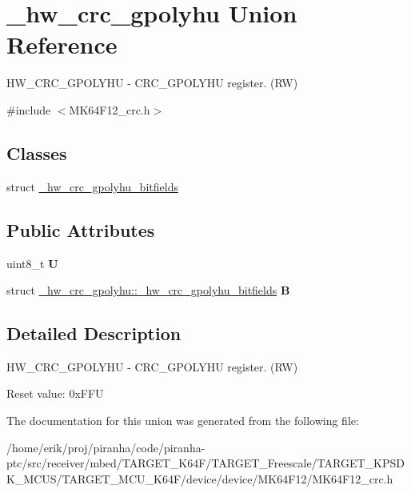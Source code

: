 \hypertarget{union__hw__crc__gpolyhu}{}\section{\+\_\+hw\+\_\+crc\+\_\+gpolyhu Union Reference}
\label{union__hw__crc__gpolyhu}


H\+W\+\_\+\+C\+R\+C\+\_\+\+G\+P\+O\+L\+Y\+HU -\/ C\+R\+C\+\_\+\+G\+P\+O\+L\+Y\+HU register. (RW)  




{\ttfamily \#include $<$M\+K64\+F12\+\_\+crc.\+h$>$}

\subsection*{Classes}
\begin{DoxyCompactItemize}
\item 
struct \hyperlink{struct__hw__crc__gpolyhu_1_1__hw__crc__gpolyhu__bitfields}{\+\_\+hw\+\_\+crc\+\_\+gpolyhu\+\_\+bitfields}
\end{DoxyCompactItemize}
\subsection*{Public Attributes}
\begin{DoxyCompactItemize}
\item 
uint8\+\_\+t {\bfseries U}\hypertarget{union__hw__crc__gpolyhu_a669b729c45e2e57ae382efd4847539c2}{}\label{union__hw__crc__gpolyhu_a669b729c45e2e57ae382efd4847539c2}

\item 
struct \hyperlink{struct__hw__crc__gpolyhu_1_1__hw__crc__gpolyhu__bitfields}{\+\_\+hw\+\_\+crc\+\_\+gpolyhu\+::\+\_\+hw\+\_\+crc\+\_\+gpolyhu\+\_\+bitfields} {\bfseries B}\hypertarget{union__hw__crc__gpolyhu_a58c9b37d0872b2d68afe75856ed99c6f}{}\label{union__hw__crc__gpolyhu_a58c9b37d0872b2d68afe75856ed99c6f}

\end{DoxyCompactItemize}


\subsection{Detailed Description}
H\+W\+\_\+\+C\+R\+C\+\_\+\+G\+P\+O\+L\+Y\+HU -\/ C\+R\+C\+\_\+\+G\+P\+O\+L\+Y\+HU register. (RW) 

Reset value\+: 0x\+F\+FU 

The documentation for this union was generated from the following file\+:\begin{DoxyCompactItemize}
\item 
/home/erik/proj/piranha/code/piranha-\/ptc/src/receiver/mbed/\+T\+A\+R\+G\+E\+T\+\_\+\+K64\+F/\+T\+A\+R\+G\+E\+T\+\_\+\+Freescale/\+T\+A\+R\+G\+E\+T\+\_\+\+K\+P\+S\+D\+K\+\_\+\+M\+C\+U\+S/\+T\+A\+R\+G\+E\+T\+\_\+\+M\+C\+U\+\_\+\+K64\+F/device/device/\+M\+K64\+F12/M\+K64\+F12\+\_\+crc.\+h\end{DoxyCompactItemize}
